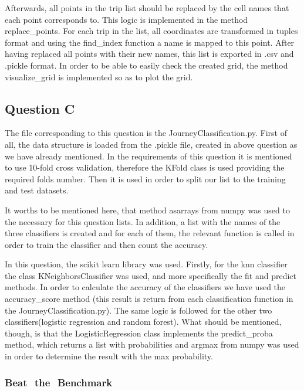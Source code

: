\documentclass[12pt]{article}
\begin{document}
	Afterwards, all points in the trip list should be replaced by the cell names that each point corresponds to. This logic is implemented in the method replace\_points. For each trip in the list, all coordinates are transformed in tuples format and using the find\_index function a name is mapped to this point. After having replaced all points with their new names, this list is exported in .csv and .pickle format. In order to be able to easily check the created grid, the method visualize\_grid is implemented so as to plot the grid. 
	
	\subsection{Question C}
	The file corresponding to this question is the JourneyClassification.py. First of all, the data structure is loaded from the .pickle file, created in above question as we have already mentioned. In the requirements of this question it is mentioned to use 10-fold cross validation, therefore the KFold class is used providing the required folds number. Then it is used in order to split our list to the training and test datasets.
	
	It worths to be mentioned here, that method asarrays from numpy was used to the necessary for this question lists. In addition, a list with the names of the three classifiers is created and for each of them, the relevant function is called in order to train the classifier and then count the accuracy. 
	
	In this question, the scikit learn library was used. Firstly, for the knn classifier the class KNeighborsClassifier was used, and more specifically the fit and predict methods. In order to calculate the accuracy of the classifiers we have used the accuracy\_score method (this result is return from each classification function in the JourneyClassification.py). The same logic is followed for the other two classifiers(logistic regression and random forest). What should be mentioned, though, is that the LogisticRegression class implements the predict\_proba method, which returns a list with probabilities and argmax from numpy was used in order to determine the result with the max probability.
	
	\subsubsection{Beat ​ ​the ​ ​Benchmark}
	
\end{document}
